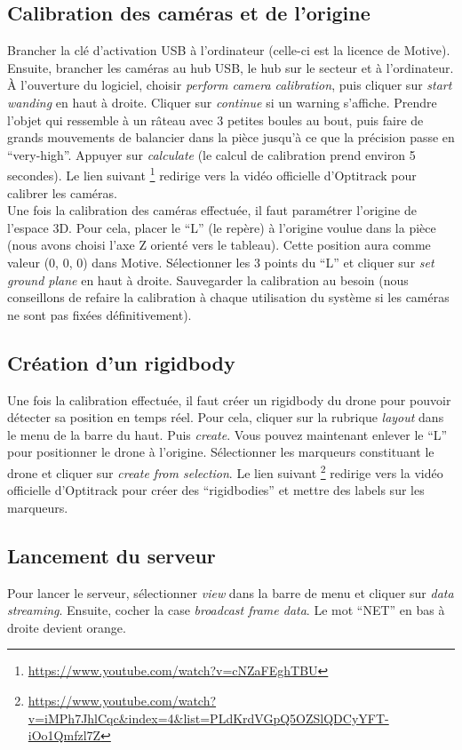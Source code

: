         \subsection{Calibration des caméras et de l'origine}
            Brancher la clé d'activation USB à l'ordinateur (celle-ci est la licence de Motive). Ensuite, brancher les caméras au hub USB, le hub sur le secteur et à l'ordinateur. À l'ouverture du logiciel, choisir \emph{perform camera calibration}, puis cliquer sur \emph{start wanding} en haut à droite. Cliquer sur \emph{continue} si un warning s'affiche. Prendre l'objet qui ressemble à un râteau avec 3 petites boules au bout, puis faire de grands mouvements de balancier dans la pièce jusqu'à ce que la précision passe en ``very-high''. Appuyer sur \emph{calculate} (le calcul de calibration prend environ 5 secondes). Le lien suivant \footnote{\url{https://www.youtube.com/watch?v=cNZaFEghTBU}} redirige vers la vidéo officielle d'Optitrack pour calibrer les caméras. \\

            Une fois la calibration des caméras effectuée, il faut paramétrer l'origine de l'espace 3D. Pour cela, placer le ``L'' (le repère) à l'origine voulue dans la pièce (nous avons choisi l'axe Z orienté vers le tableau). Cette position aura comme valeur (0, 0, 0) dans Motive. Sélectionner les 3 points du ``L'' et cliquer sur \emph{set ground plane} en haut à droite. Sauvegarder la calibration au besoin (nous conseillons de refaire la calibration à chaque utilisation du système si les caméras ne sont pas fixées définitivement).

        \subsection{Création d'un rigidbody}
            Une fois la calibration effectuée, il faut créer un rigidbody du drone pour pouvoir détecter sa position en temps réel. Pour cela, cliquer sur la rubrique \emph{layout} dans le menu de la barre du haut. Puis \emph{create}. Vous pouvez maintenant enlever le ``L'' pour positionner le drone à l'origine. Sélectionner les marqueurs constituant le drone et cliquer sur \emph{create from selection}. Le lien suivant \footnote{\url{https://www.youtube.com/watch?v=iMPh7JhlCqc&index=4&list=PLdKrdVGpQ5OZSlQDCyYFT-iOo1Qmfzl7Z}} redirige vers la vidéo officielle d'Optitrack pour créer des ``rigidbodies'' et mettre des labels sur les marqueurs.

        \subsection{Lancement du serveur}
            Pour lancer le serveur, sélectionner \emph{view} dans la barre de menu et cliquer sur \emph{data streaming}. Ensuite, cocher la case \emph{broadcast frame data}. Le mot ``NET'' en bas à droite devient orange.



